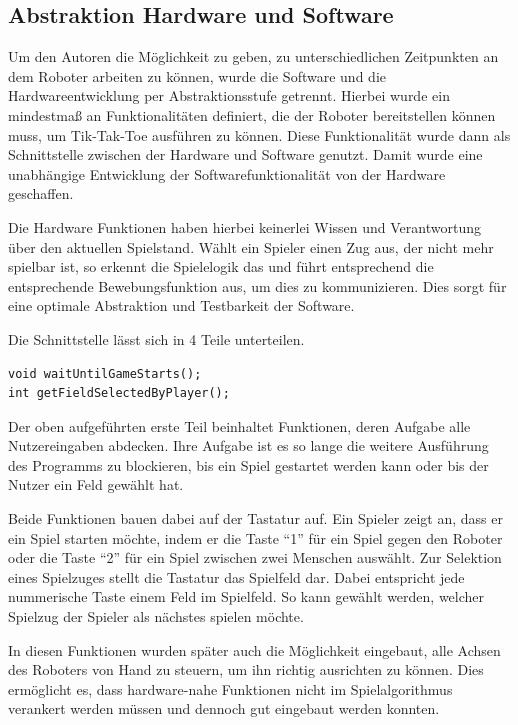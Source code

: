 \documentclass[conference,compsoc,final,a4paper]{IEEEtran}
\begin{document}
\subsection{Abstraktion Hardware und Software}

Um den Autoren die Möglichkeit zu geben, zu unterschiedlichen Zeitpunkten an dem Roboter arbeiten
zu können, wurde die Software und die Hardwareentwicklung per Abstraktionsstufe getrennt. Hierbei wurde
ein mindestmaß an Funktionalitäten definiert, die der Roboter bereitstellen können muss, um Tik-Tak-Toe
ausführen zu können. Diese Funktionalität wurde dann als Schnittstelle zwischen der Hardware und Software
genutzt. Damit wurde eine unabhängige Entwicklung der Softwarefunktionalität von der Hardware geschaffen.

Die Hardware Funktionen haben hierbei keinerlei Wissen und Verantwortung über den aktuellen Spielstand.
Wählt ein Spieler einen Zug aus, der nicht mehr spielbar ist, so erkennt die Spielelogik das und führt
entsprechend die entsprechende Bewebungsfunktion aus, um dies zu kommunizieren. Dies sorgt für eine
optimale Abstraktion und Testbarkeit der Software.

Die Schnittstelle lässt sich in 4 Teile unterteilen.

\begin{verbatim}
void waitUntilGameStarts();
int getFieldSelectedByPlayer();
\end{verbatim}

Der oben aufgeführten erste Teil beinhaltet Funktionen, deren Aufgabe alle Nutzereingaben abdecken.
Ihre Aufgabe ist es so lange die weitere Ausführung des Programms zu blockieren,
bis ein Spiel gestartet werden kann oder bis der Nutzer ein Feld gewählt hat.

Beide Funktionen bauen dabei auf der Tastatur auf. Ein Spieler zeigt an, dass er ein Spiel starten
möchte, indem er die Taste \enquote{1} für ein Spiel gegen den Roboter oder die Taste \enquote{2}
für ein Spiel zwischen zwei Menschen auswählt. Zur Selektion eines Spielzuges stellt die Tastatur
das Spielfeld dar. Dabei entspricht jede nummerische Taste einem Feld im Spielfeld. So kann
gewählt werden, welcher Spielzug der Spieler als nächstes spielen möchte.

In diesen Funktionen wurden später auch die Möglichkeit eingebaut, alle Achsen des Roboters von 
Hand zu steuern, um ihn richtig ausrichten zu können. Dies ermöglicht es, dass hardware-nahe Funktionen
nicht im Spielalgorithmus verankert werden müssen und dennoch gut eingebaut werden konnten.
\end{document}
